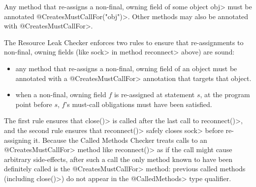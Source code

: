 
Any method that re-assigns a non-final, owning field of some object \<obj>
must be annotated \<@CreatesMustCallFor("obj")>.
Other methods may also be annotated with \<@CreatesMustCallFor>.

The Resource Leak Checker enforces two rules to ensure that re-assignments
to non-final, owning fields (like \<sock> in method \<reconnect> above) are
sound:
\begin{itemize}
\item any method that re-assigns a non-final, owning field of an object
  must be annotated with a \<@CreatesMustCallFor> annotation
  that targets that object.
\item when a non-final, owning field $f$ is re-assigned at statement $s$,
  at the program point before $s$, $f$'s must-call obligations must have been satisfied.
\end{itemize}
\noindent
The first rule ensures that \<close()> is called after the last call
to \<reconnect()>, and the second rule ensures that \<reconnect()>
safely closes \<sock> before re-assigning it. Because the Called Methods Checker
treats calls to an \<@CreatesMustCallFor> method like \<reconnect()> as if the call might
cause arbitrary side-effects, after such a call the only method known to have been
definitely called is the \<@CreatesMustCallFor> method: previous called
methods (including \<close()>) do not appear in the \<@CalledMethods> type qualifier.


